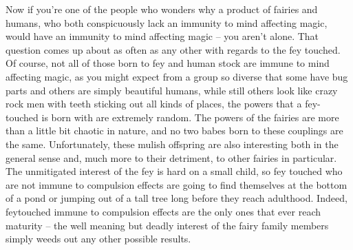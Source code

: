 
Now if you're one of the people who wonders why a product of fairies and humans, who both conspicuously lack an immunity to mind affecting magic, would have an immunity to mind affecting magic -- you aren't alone. That question comes up about as often as any other with regards to the fey touched. Of course, not all of those born to fey and human stock are immune to mind affecting magic, as you might expect from a group so diverse that some have bug parts and others are simply beautiful humans, while still others look like crazy rock men with teeth sticking out all kinds of places, the powers that a fey-touched is born with are extremely random. The powers of the fairies are more than a little bit chaotic in nature, and no two babes born to these couplings are the same. Unfortunately, these mulish offspring are also interesting both in the general sense and, much more to their detriment, to other fairies in particular. The unmitigated interest of the fey is hard on a small child, so fey touched who are not immune to compulsion effects are going to find themselves at the bottom of a pond or jumping out of a tall tree long before they reach adulthood. Indeed, feytouched immune to compulsion effects are the only ones that ever reach maturity -- the well meaning but deadly interest of the fairy family members simply weeds out any other possible results.
